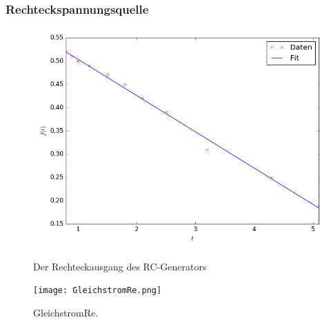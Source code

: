 \subsubsection{Rechteckspannungsquelle}

\begin{figure}[H]
	\centering
	\caption{Der Rechteckausgang des RC-Generators }
	\includegraphics[width=\linewidth-150pt,height=\textheight-150pt,keepaspectratio]{Rechteck.png}
	\label{fig:Rechteck}
\end{figure}





\begin{figure}[H]
	\centering
	\caption{GleichstromRe.}
	\texttt{[image: GleichstromRe.png]}
	\label{fig:GleichstromRe}
\end{figure}
\cite{scipy}
